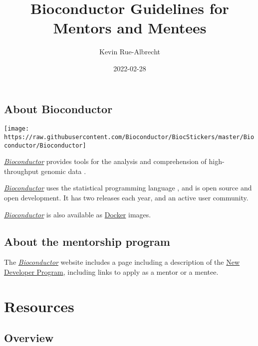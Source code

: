 \documentclass[
]{book}
\title{Bioconductor Guidelines for Mentors and Mentees}
\author{Kevin Rue-Albrecht}
\date{2022-02-28}
\begin{document}
\maketitle

{
\setcounter{tocdepth}{1}
\tableofcontents
}
\hypertarget{about-bioconductor}{%
\chapter*{About Bioconductor}\label{about-bioconductor}}

\begin{center}\texttt{[image: https://raw.githubusercontent.com/Bioconductor/BiocStickers/master/Bioconductor/Bioconductor]} \end{center}

\href{https://bioconductor.org/}{\emph{Bioconductor}} provides tools for the analysis and comprehension of high-throughput genomic data \citep{orchestrating2015}.

\href{https://bioconductor.org/}{\emph{Bioconductor}} uses the statistical programming language \citep{r2021}, and is open source and open development. It has two releases each year, and an active user community.

\href{https://bioconductor.org/}{\emph{Bioconductor}} is also available as \href{https://bioconductor.org/help/docker/}{Docker} images.

\hypertarget{about-the-mentorship-program}{%
\chapter{About the mentorship program}\label{about-the-mentorship-program}}

The \href{https://bioconductor.org/}{\emph{Bioconductor}} website includes a page including a description of the \href{https://bioconductor.org/developers/new-developer-program/}{New Developer Program},
including links to apply as a mentor or a mentee.

\hypertarget{part-resources}{%
\part{Resources}\label{part-resources}}

\hypertarget{resources-overview}{%
\chapter*{Overview}\label{resources-overview}}
\end{document}
